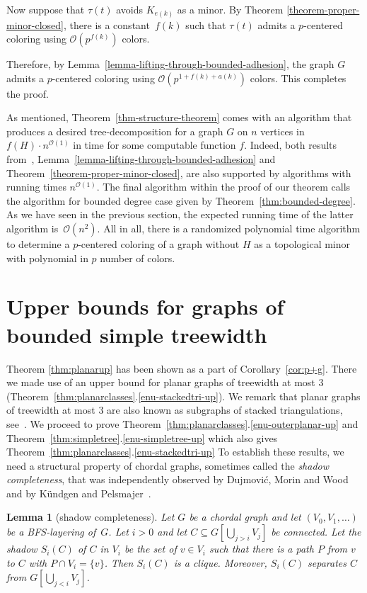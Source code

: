 \documentclass[11pt]{article}
\newtheorem{lemma}[theorem]{Lemma}
\begin{document}
Now suppose that $\tau(t)$ avoids $K_{e(k)}$ as a minor.  By Theorem
\ref{theorem-proper-minor-closed}, there is a constant~$f(k)$ such that
$\tau(t)$ admits a $p$-centered coloring using $\mathcal{O}(p^{f(k)})$ colors.

Therefore, by Lemma~\ref{lemma-lifting-through-bounded-adhesion}, the graph $G$ 
admits a $p$-centered coloring using $\mathcal{O}(p^{1+f(k)+a(k)})$ colors.
This completes the proof.

As mentioned, Theorem~\ref{thm-structure-theorem} comes with an algorithm 
that produces a desired tree-decomposition for a graph $G$ on $n$ vertices in
$f(H)\cdot n^{\mathcal{O}(1)}$ in time for some computable function $f$. Indeed, both results
from~\cite{PS19},  Lemma~\ref{lemma-lifting-through-bounded-adhesion} and
Theorem~\ref{theorem-proper-minor-closed}, are also supported by algorithms
with  running times $n^{\mathcal{O}(1)}$. The final algorithm within the proof of our theorem
calls the algorithm for bounded degree case given by 
Theorem~\ref{thm:bounded-degree}.
As we have seen in the previous section, the expected running
time of the latter algorithm is~$\mathcal{O}(n^2)$. All in all, there is a randomized polynomial time
algorithm to determine a $p$-centered coloring of a graph without  $H$ as a topological
minor with polynomial in $p$ number of colors.

\section{Upper bounds for graphs of bounded simple treewidth}
\label{sec-upper-bounds-subplanars}

Theorem \ref{thm:planarup} has been shown as a part of
Corollary~\ref{cor:p+g}.  There we made use of an upper bound for planar
graphs of treewidth at most 3
(Theorem~\ref{thm:planarclasses}.\ref{enu-stackedtri-up}).  We remark that
planar graphs of treewidth at most 3 are also known as subgraphs of stacked
triangulations, see~\cite{KV12}. We proceed to prove
Theorem~\ref{thm:planarclasses}.\ref{enu-outerplanar-up} and
Theorem~\ref{thm:simpletree}.\ref{enu-simpletree-up} which also gives
Theorem~\ref{thm:planarclasses}.\ref{enu-stackedtri-up} To establish these
results, we need a structural property of chordal graphs, sometimes called the
\emph{shadow completeness}, that was independently observed by Dujmovi\'c,
Morin and Wood~\cite{DMM05} and by Kündgen and Pelsmajer~\cite{KP08}.
  
\begin{lemma}[shadow completeness]\label{lemma-shadow}
  Let $G$ be a chordal graph and let $(V_0,V_1,\ldots)$ be a BFS-layering
  of~$G$. Let $i>0$ and let $C\subseteq G[\bigcup_{j> i} V_j]$ be
  connected. Let the \emph{shadow} $S_i(C)$ of $C$ in $V_i$ be the set of
  $v\in V_i$ such that there is a path $P$ from $v$ to $C$ with
  $P\cap V_i = \{v\}$. Then $S_i(C)$ is a clique. Moreover, $S_i(C)$ separates
  $C$ from $G[\bigcup_{j< i} V_j]$.
\end{lemma}
\end{document}
